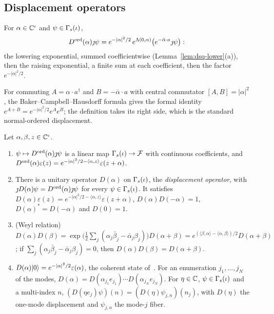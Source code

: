 \begin{veteenv}
\subsection{Displacement operators}\label{sec:dsq-disp}

\begin{definition}\label{def:dsq-disp}
For $\alpha\in\mathbb C^\iota$ and $\psi\in\Gamma_s(\iota)$,
\[
 D^{\mathrm{ord}}(\alpha)\jmath\psi=e^{-\lvert\alpha\rvert^2/2}\,e^{\Lambda(0,\alpha)}\bigl(e^{-\bar\alpha\cdot a}\jmath\psi\bigr):
\]
the lowering exponential, summed coefficientwise (Lemma~\ref{lem:dsq-lower}(a)), then the raising exponential, a finite
sum at each coefficient, then the factor $e^{-\lvert\alpha\rvert^2/2}$.
\end{definition}

For commuting $A=\alpha\cdot a^\dagger$ and $B=-\bar\alpha\cdot a$ with central commutator $[A,B]=\lvert\alpha\rvert^2$, the
Baker--Campbell--Hausdorff formula gives the formal identity $e^{A+B}=e^{-\lvert\alpha\rvert^2/2}e^Ae^B$; the definition takes its
right side, which is the standard normal-ordered displacement.

\begin{theorem}\label{thm:dsq-disp}
Let $\alpha,\beta,z\in\mathbb C^\iota$.
\begin{enumerate}
\item[(a)] $\psi\mapsto D^{\mathrm{ord}}(\alpha)\jmath\psi$ is a linear map $\Gamma_s(\iota)\to\mathcal F$ with continuous coefficients, and
$D^{\mathrm{ord}}(\alpha)\varepsilon(z)=e^{-\lvert\alpha\rvert^2/2-\langle\alpha,z\rangle}\varepsilon(z+\alpha)$.
\item[(b)] There is a unitary operator $D(\alpha)$ on $\Gamma_s(\iota)$, the \emph{displacement operator}, with
$\jmath D(\alpha)\psi=D^{\mathrm{ord}}(\alpha)\jmath\psi$ for every $\psi\in\Gamma_s(\iota)$. It satisfies
$D(\alpha)\varepsilon(z)=e^{-\lvert\alpha\rvert^2/2-\langle\alpha,z\rangle}\varepsilon(z+\alpha)$, $D(\alpha)D(-\alpha)=1$,
$D(\alpha)^*=D(-\alpha)$ and $D(0)=1$.
\item[(c)] (Weyl relation) $D(\alpha)D(\beta)=\exp\bigl(\tfrac12\sum_j(\alpha_j\bar\beta_j-\bar\alpha_j\beta_j)\bigr)
D(\alpha+\beta)=e^{(\langle\beta,\alpha\rangle-\langle\alpha,\beta\rangle)/2}D(\alpha+\beta)$; if
$\sum_j(\alpha_j\bar\beta_j-\bar\alpha_j\beta_j)=0$, then $D(\alpha)D(\beta)=D(\alpha+\beta)$.
\item[(d)] $D(\alpha)\lvert 0\rangle=e^{-\lvert\alpha\rvert^2/2}\varepsilon(\alpha)$, the coherent state of~\cite[(5)]{tjoacirac}.
For an enumeration $j_1,\ldots,j_N$ of the modes, $D(\alpha)=D(\alpha_{j_1}e_{j_1})\cdots D(\alpha_{j_N}e_{j_N})$. For
$\eta\in\mathbb C$, $\psi\in\Gamma_s(\iota)$ and a multi-index $n$, $(D(\eta e_j)\psi)(n)=(D(\eta)\psi_{j,n})(n_j)$, with $D(\eta)$ the
one-mode displacement and $\psi_{j,n}$ the mode-$j$ fiber.
\end{enumerate}
\end{theorem}


\end{veteenv}
